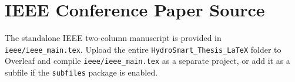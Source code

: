 \chapter{IEEE Conference Paper Source}
\label{app:ieee}

The standalone IEEE two-column manuscript is provided in \texttt{ieee/ieee\_main.tex}. Upload the entire \texttt{HydroSmart\_Thesis\_LaTeX} folder to Overleaf and compile \texttt{ieee/ieee\_main.tex} as a separate project, or add it as a subfile if the \texttt{subfiles} package is enabled.
